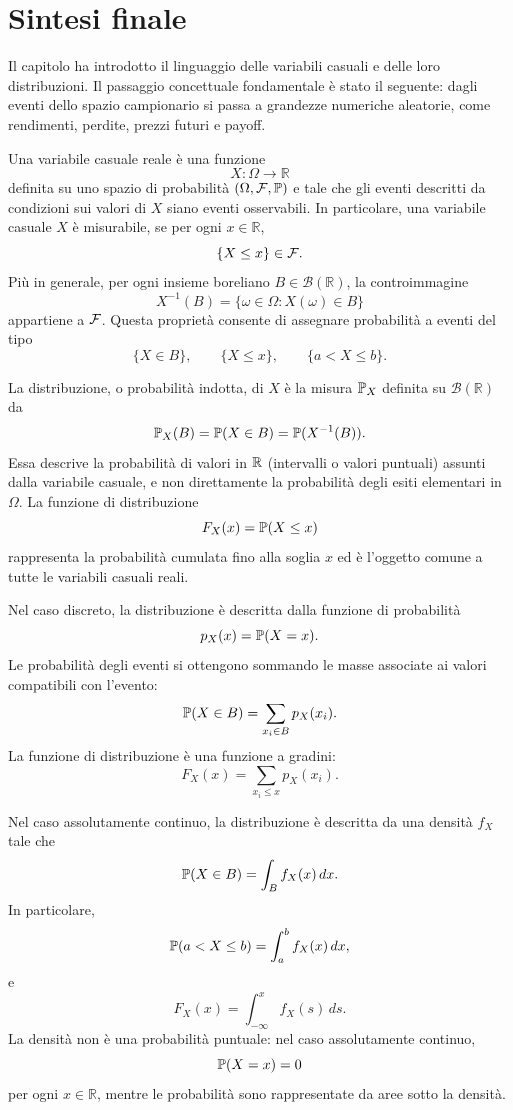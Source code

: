 \section{Sintesi finale}
\label{sec:cap2-sintesi-finale}

Il capitolo ha introdotto il linguaggio delle variabili casuali e delle loro
distribuzioni. Il passaggio concettuale fondamentale \`{e} stato il seguente:
dagli eventi dello spazio campionario si passa a grandezze numeriche aleatorie,
come rendimenti, perdite, prezzi futuri e payoff.

Una variabile casuale reale \`{e} una funzione
\[
X:\Omega\longrightarrow \mathbb{R}
\]
definita su uno spazio di probabilit\`{a} $(\Omega,\mathcal{F},\mathbb{P})$ e tale che gli
eventi descritti da condizioni sui valori di $X$ siano eventi osservabili. In
particolare, una variabile casuale $X$ \`{e} misurabile, se per ogni $x\in\mathbb{R}$,
\[
\{X\leq x\}\in\mathcal{F}.
\]
Pi\`{u} in generale, per ogni insieme boreliano $B\in\mathcal{B}(\mathbb{R})$,
la controimmagine
\[
X^{-1}(B)=\{\omega\in\Omega:X(\omega)\in B\}
\]
appartiene a $\mathcal{F}$. Questa propriet\`{a} consente di assegnare probabilit\`{a} a
eventi del tipo
\[
\{X\in B\},
\qquad
\{X\leq x\},
\qquad
\{a<X\leq b\}.
\]

La distribuzione, o probabilit\`{a} indotta, di $X$ \`{e} la misura
$\mathbb{P}_X$ definita su $\mathcal{B}(\mathbb{R})$ da
\[
\mathbb{P}_X(B)
=
\mathbb{P}(X\in B)
=
\mathbb{P}(X^{-1}(B)).
\]
Essa descrive la probabilit\`{a} di valori in $\mathbb{R}$ (intervalli o valori puntuali) assunti dalla variabile casuale, e
non direttamente la probabilit\`{a} degli esiti elementari in $\Omega$. La funzione di
distribuzione
\[
F_X(x)=\mathbb{P}(X\leq x)
\]
rappresenta la probabilit\`{a} cumulata fino alla soglia $x$ ed \`{e} l'oggetto
comune a tutte le variabili casuali reali.

Nel caso discreto, la distribuzione \`{e} descritta dalla funzione di
probabilit\`{a}
\[
p_X(x)=\mathbb{P}(X=x).
\]
Le probabilit\`{a} degli eventi si ottengono sommando le masse associate ai valori
compatibili con l'evento:
\[
\mathbb{P}(X\in B)
=
\sum_{x_i\in B}p_X(x_i).
\]
La funzione di distribuzione \`{e} una funzione a gradini:
\[
F_X(x)=\sum_{x_i\leq x}p_X(x_i).
\]

Nel caso assolutamente continuo, la distribuzione \`{e} descritta da una densit\`{a}
$f_X$ tale che
\[
\mathbb{P}(X\in B)
=
\int_B f_X(x)\,dx.
\]
In particolare,
\[
\mathbb{P}(a<X\leq b)
=
\int_a^b f_X(x)\,dx,
\]
e
\[
F_X(x)
=
\int_{-\infty}^{x}f_X(s)\,ds.
\]
La densit\`{a} non \`{e} una probabilit\`{a} puntuale: nel caso assolutamente
continuo,
\[
\mathbb{P}(X=x)=0
\]
per ogni $x\in\mathbb{R}$, mentre le probabilit\`{a} sono rappresentate da aree
sotto la densit\`{a}.

